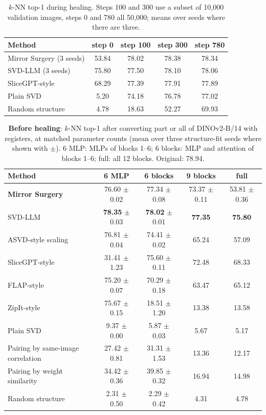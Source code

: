 \begin{table}[h]
  \centering
  \small
  \caption{$k$-NN top-1 during healing. Steps 100 and 300 use a subset of 10{,}000 validation images, steps 0 and 780
  all 50{,}000; means over seeds where there are three.}
  \label{tab:curves}
  \begin{tabular}{lcccc}
    \toprule
    Method & step 0 & step 100 & step 300 & step 780 \\
    \midrule
    Mirror Surgery (3 seeds) & 53.84 & 78.02 & 78.38 & 78.34 \\
    SVD-LLM (3 seeds)        & 75.80 & 77.50 & 78.10 & 78.06 \\
    SliceGPT-style           & 68.29 & 77.39 & 77.91 & 77.89 \\
    Plain SVD                & 5.20  & 74.18 & 76.78 & 77.02 \\
    Random structure         & 4.78  & 18.63 & 52.27 & 69.93 \\
    \bottomrule
  \end{tabular}
\end{table}

\begin{table}[h]
  \centering
  \small
  \caption{\textbf{Before healing}: $k$-NN top-1 after converting part or all of DINOv2-B/14 with registers, at
  matched parameter counts (mean over three structure-fit seeds where shown with $\pm$). 6 MLP: MLPs of blocks 1--6;
  6 blocks: MLP and attention of blocks 1--6; full: all 12 blocks. Original: 78.94.}
  \label{tab:zeroshot}
  \setlength{\tabcolsep}{5pt}
  \begin{tabular}{lcccc}
    \toprule
    Method & 6 MLP & 6 blocks & 9 blocks & full \\
    \midrule
    \textbf{Mirror Surgery}            & 76.60 $\pm$ 0.02 & 77.34 $\pm$ 0.08 & 73.37 $\pm$ 0.11 & 53.81 $\pm$ 0.36 \\
    SVD-LLM                            & \textbf{78.35} $\pm$ 0.03 & \textbf{78.02} $\pm$ 0.01 & \textbf{77.35} & \textbf{75.80} \\
    ASVD-style scaling                 & 76.81 $\pm$ 0.04 & 74.41 $\pm$ 0.02 & 65.24 & 57.09 \\
    SliceGPT-style                     & 31.41 $\pm$ 1.23 & 75.60 $\pm$ 0.11 & 72.48 & 68.33 \\
    FLAP-style                         & 75.20 $\pm$ 0.07 & 70.29 $\pm$ 0.18 & 63.47 & 65.12 \\
    ZipIt-style                        & 75.67 $\pm$ 0.15 & 18.51 $\pm$ 1.20 & 13.38 & 13.58 \\
    Plain SVD                          & 9.37 $\pm$ 0.00  & 5.87 $\pm$ 0.03  & 5.67  & 5.17 \\
    \midrule
    Pairing by same-image correlation  & 27.42 $\pm$ 0.81 & 31.31 $\pm$ 1.53 & 13.36 & 12.17 \\
    Pairing by weight similarity       & 34.42 $\pm$ 0.36 & 39.85 $\pm$ 0.32 & 16.94 & 14.98 \\
    Random structure                   & 2.31 $\pm$ 0.50  & 2.29 $\pm$ 0.42  & 4.31  & 4.78 \\
    \bottomrule
  \end{tabular}
\end{table}

